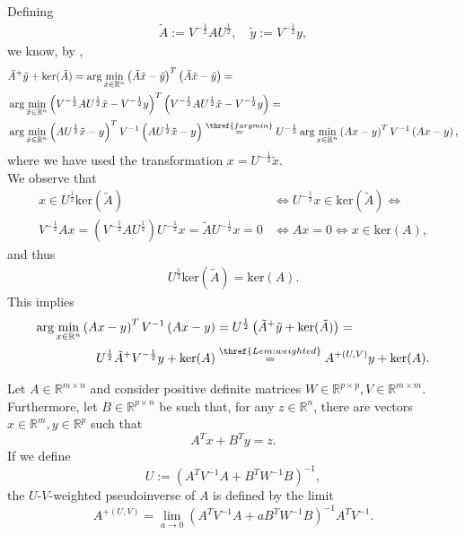 \documentclass[a4paper,11pt]{report}
\begin{document}
\begin{Bew}
Defining
\begin{align*}
\tilde{A}:=V^{-\frac12}AU^{\frac12},
\quad
\tilde{y}:=V^{-\frac12}y,
\end{align*}
we know, by ,
\begin{align*}
&\tilde{A}^+\tilde{y}+\text{ker}(\tilde{A})=
\arg\min_{\tilde{x}\in\mathbb{R}^n}\left(\tilde{A}\tilde{x}-\tilde{y}\right)^T\left(\tilde{A}\tilde{x}-\tilde{y}\right)=\\
&\arg\min_{\tilde{x}\in\mathbb{R}^n}\left(V^{-\frac12}AU^{\frac12}\tilde{x}-V^{-\frac12}y\right)^T\left(V^{-\frac12}AU^{\frac12}\tilde{x}-V^{-\frac12}y\right)=\\
&\arg\min_{\tilde{x}\in\mathbb{R}^n}\left(AU^{\frac12}\tilde{x}-y\right)^TV^{-1}\left(AU^{\frac12}\tilde{x}-y\right)\overset{\thref{fargmin}}{=}
U^{-\frac12}\arg\min_{x\in\mathbb{R}^n}\left(Ax-y\right)^TV^{-1}\left(Ax-y\right),
\end{align*}
where we have used the transformation $x=U^{-\frac12}\tilde{x}$.\\
We observe that
\begin{align*}
x\in U^{\frac12}\text{ker}(\tilde{A})&\Leftrightarrow
U^{-\frac12}x\in\text{ker}(\tilde{A})\Leftrightarrow\\
V^{-\frac12}Ax=\left(V^{-\frac12}AU^{\frac12}\right)U^{-\frac12}x=\tilde{A}U^{-\frac12}x=0&\Leftrightarrow
Ax=0\Leftrightarrow
x\in\text{ker}(A),
\end{align*}
and thus
\begin{align*}
U^{\frac12}\text{ker}(\tilde{A})=\text{ker}(A).
\end{align*}
This implies
\begin{align*}
\arg\min_{x\in\mathbb{R}^n}\left(Ax-y\right)^TV^{-1}\left(Ax-y\right)&=
U^{\frac12}\left(\tilde{A}^+\tilde{y}+\text{ker}(\tilde{A})\right)=\\
U^{\frac12}\tilde{A}^+V^{-\frac12}y+\text{ker}(A)&\overset{\thref{Lem:weighted}}{=}
A^{+(U,V)}y+\text{ker}(A).
\end{align*}
\end{Bew}

\begin{The}\label{pseudolim}
Let $A\in\mathbb{R}^{m\times n}$ and consider positive definite matrices $W\in\mathbb{R}^{p\times p},V\in\mathbb{R}^{m\times m}$. Furthermore, let $B\in\mathbb{R}^{p\times n}$ be such that, for any $z\in\mathbb{R}^n$, there are vectors $x\in\mathbb{R}^m,y\in\mathbb{R}^p$ such that
\begin{equation}\label{pseudolim-cond}
A^Tx+B^Ty=z.
\end{equation}
If we define
\begin{equation}
U:=\left(A^TV^{-1}A+B^TW^{-1}B\right)^{-1},
\end{equation}
the $U$-$V$-weighted pseudoinverse of $A$ is defined by the limit
\begin{equation}
A^{+(U,V)}=\lim_{a\to 0}\left(A^TV^{-1}A+aB^TW^{-1}B\right)^{-1}A^TV^{-1}.
\end{equation}
\end{The}
\end{document}

